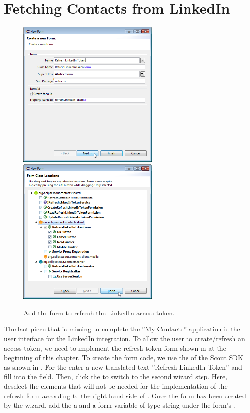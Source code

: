\documentclass[a4paper,10pt,twoside]{book}
\begin{document}
\section{Fetching Contacts from LinkedIn}

\begin{figure}
\includegraphics[width=7cm]{new_form_token_1.png} \hspace{5mm}
\includegraphics[width=7cm]{new_form_token_2.png}
\caption{Add the form to refresh the LinkedIn access token.}
\end{figure}

The last piece that is missing to complete the ''My Contacts'' application is the user interface for the LinkedIn integration. 
To allow the user to create/refresh an access token, we need to implement the refresh token form shown in  at the beginning of this chapter. 
To create the form code, we use the  of the Scout SDK as shown in . 
For the  enter a new translated text ''Refresh LinkedIn Token'' and fill  into the  field. 
Then, click the  to switch to the second wizard step. 
Here, deselect the elements that will not be needed for the implementation of the refresh form according to the right hand side of . 
Once the form has been created by the wizard, add the a  and a  form variable of type string under the form's . 
\end{document}
